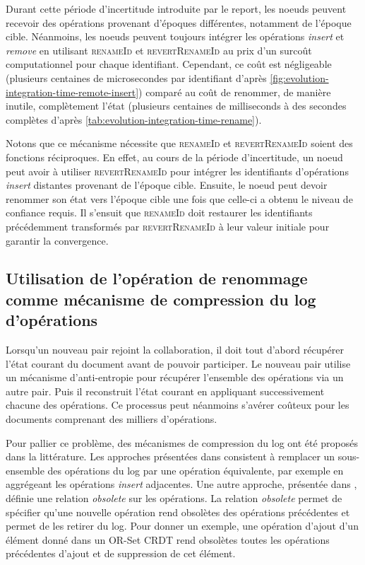 \documentclass[12pt]{thesul}
\begin{document}
Durant cette période d'incertitude introduite par le report, les noeuds peuvent recevoir des opérations provenant d'époques différentes, notamment de l'époque cible.
Néanmoins, les noeuds peuvent toujours intégrer les opérations \emph{insert} et \emph{remove} en utilisant \textsc{renameId} et \textsc{revertRenameId} au prix d'un surcoût computationnel pour chaque identifiant.
Cependant, ce coût est négligeable (plusieurs centaines de microsecondes par identifiant d'après \autoref{fig:evolution-integration-time-remote-insert}) comparé au coût de renommer, de manière inutile, complètement l'état (plusieurs centaines de milliseconds à des secondes complètes d'après \autoref{tab:evolution-integration-time-rename}).

Notons que ce mécanisme nécessite que \textsc{renameId} et \textsc{revertRenameId} soient des fonctions réciproques.
En effet, au cours de la période d'incertitude, un noeud peut avoir à utiliser \textsc{revertRenameId} pour intégrer les identifiants d'opérations \emph{insert} distantes provenant de l'époque cible.
Ensuite, le noeud peut devoir renommer son état vers l'époque cible une fois que celle-ci a obtenu le niveau de confiance requis.
Il s'ensuit que \textsc{renameId} doit restaurer les identifiants précédemment transformés par \textsc{revertRenameId} à leur valeur initiale pour garantir la convergence.

\subsection{Utilisation de l'opération de renommage comme mécanisme de compression du log d'opérations}

\label{sec:rename-as-compression-mechanism}

Lorsqu'un nouveau pair rejoint la collaboration, il doit tout d'abord récupérer l'état courant du document avant de pouvoir participer.
Le nouveau pair utilise un mécanisme d'anti-entropie \cite{1983-anti-entropy-vv} pour récupérer l'ensemble des opérations via un autre pair.
Puis il reconstruit l'état courant en appliquant successivement chacune des opérations.
Ce processus peut néanmoins s'avérer coûteux pour les documents comprenant des milliers d'opérations.

Pour pallier ce problème, des mécanismes de compression du log ont été proposés dans la littérature.
Les approches présentées dans \cite{2002-log-compression-op-based-vcs-shen-sun, 2006-these-claudia} consistent à remplacer un sous-ensemble des opérations du log par une opération équivalente, par exemple en aggrégeant les opérations \emph{insert} adjacentes.
Une autre approche, présentée dans \cite{2014-making-op-based-crdts-op-based}, définie une relation \emph{obsolete} sur les opérations.
La relation \emph{obsolete} permet de spécifier qu'une nouvelle opération rend obsolètes des opérations précédentes et permet de les retirer du log.
Pour donner un exemple, une opération d'ajout d'un élément donné dans un OR-Set \ac{CRDT} rend obsolètes toutes les opérations précédentes d'ajout et de suppression de cet élément.
\end{document}

